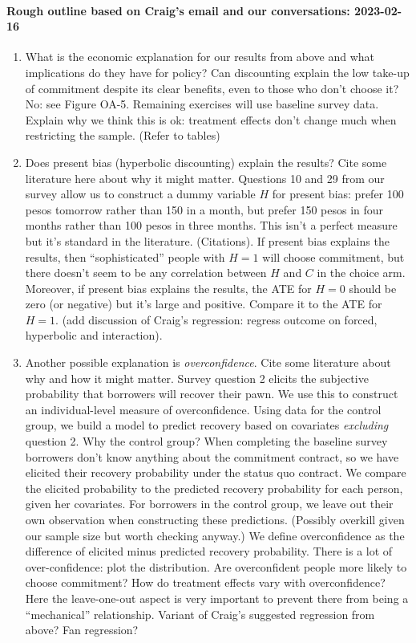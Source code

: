 \documentclass[oneside,11pt]{article}
\begin{document}
\paragraph{Rough outline based on Craig's email and our conversations: 2023-02-16}
\begin{enumerate}
    \item What is the economic explanation for our results from above and what implications do they have for policy? Can discounting explain the low take-up of commitment despite its clear benefits, even to those who don't choose it? No: see Figure OA-5. Remaining exercises will use baseline survey data. Explain why we think this is ok: treatment effects don't change much when restricting the sample. (Refer to tables)
    \item Does present bias (hyperbolic discounting) explain the results? Cite some literature here about why it might matter. Questions 10 and 29 from our survey allow us to construct a dummy variable $H$ for present bias: prefer 100 pesos tomorrow rather than 150 in a month, but prefer 150 pesos in four months rather than 100 pesos in three months. This isn't a perfect measure but it's standard in the literature. (Citations). If present bias explains the results, then ``sophisticated'' people with $H = 1$ will choose commitment, but there doesn't seem to be any correlation between $H$ and $C$ in the choice arm. Moreover, if present bias explains the results, the ATE for $H=0$ should be zero (or negative) but it's large and positive. Compare it to the ATE for $H=1$. (add discussion of Craig's regression: regress outcome on forced, hyperbolic and interaction).
    \item Another possible explanation is \emph{overconfidence}.  Cite some literature about why and how it might matter. Survey question 2 elicits the subjective probability that borrowers will recover their pawn. We use this to construct an individual-level measure of overconfidence. Using data for the control group, we build a model to predict recovery based on covariates \emph{excluding} question 2. Why the control group? When completing the baseline survey borrowers don't know anything about the commitment contract, so we have elicited their recovery probability under the status quo contract. We compare the elicited probability to the predicted recovery probability for each person, given her covariates. For borrowers in the control group, we leave out their own observation when constructing these predictions. (Possibly overkill given our sample size but worth checking anyway.) We define overconfidence as the difference of elicited minus predicted recovery probability. There is a lot of over-confidence: plot the distribution. Are overconfident people more likely to choose commitment? How do treatment effects vary with overconfidence? Here the leave-one-out aspect is very important to prevent there from being a ``mechanical'' relationship. Variant of Craig's suggested regression from above? Fan regression?  

\end{enumerate}
\end{document}

